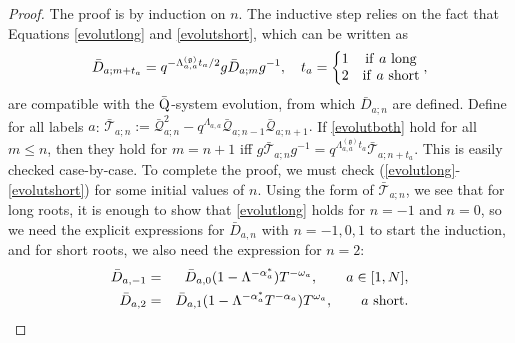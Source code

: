 \documentclass[12pt]{amsart}
\newcommand{\barQ}{$\bar{\rm Q}$}
\newcommand{\barD}{\bar D}
\newcommand{\g}{{\mathfrak{g}}}
\newcommand{\Q}{{\mathcal Q}}
\numberwithin{equation}{section}
\begin{document}
\begin{proof} The proof is by induction on $n$. The inductive step relies on the fact
that Equations \eqref{evolutlong} and \eqref{evolutshort}, which can be written as
\begin{equation}\label{evolutboth}
\barD_{a;m+t_a} = q^{-\Lambda_{a,a}^{(\g)} t_a/2} g\barD_{a;m} g^{-1},\quad  t_a=\left\{ \begin{matrix}1 & {\rm if} \ a\ {\rm long}\\
2 & {\rm if} \ a\ {\rm short}
\end{matrix}\right. ,
\end{equation}
are compatible with the \barQ-system evolution, from which $\barD_{a;n}$ are defined. 
%
Define for all labels $a$: %
$\bar{\mathcal T}_{a;n}:=\bar\Q_{a;n}^2 -q^{\Lambda_{a,a}} \bar\Q_{a;n-1} \bar\Q_{a;n+1}.
%
$
%
If \eqref{evolutboth} hold for all  $m\leq n$,  then they hold for $m=n+1$ iff $g \bar{\mathcal T}_{a;n}g^{-1} = q^{\Lambda_{a,a}^{(\g)}t_a }\bar{\mathcal T}_{a;n+t_a}$. This is easily checked case-by-case.
To complete the proof, we must check (\ref{evolutlong}-\ref{evolutshort}) for some initial values of $n$.
%
Using the form of $\bar{\mathcal T}_{a;n}$, we see that for long roots, it is enough  to show that \eqref{evolutlong} holds for $n=-1$ and $n=0$, so we need the explicit expressions for 
$\barD_{a,n}$ with $n=-1,0,1$ to start the induction, and for short roots, we also need the expression for $n=2$:
%
%
\begin{eqnarray}
\barD_{a,-1} &=& \barD_{a,0} (1-\Lambda^{-\alpha_a^*}) T^{-\omega_a} ,\label{genericm1a} \qquad a\in[1,N],\\
%
\barD_{a,2} &=& \barD_{a,1} (1-\Lambda^{-\alpha_a^*}T^{-\alpha_a}) T^{\omega_a},\label{generic2a} \qquad \hbox{$a$ short.}
 \end{eqnarray}
 

\end{proof}
\end{document}
